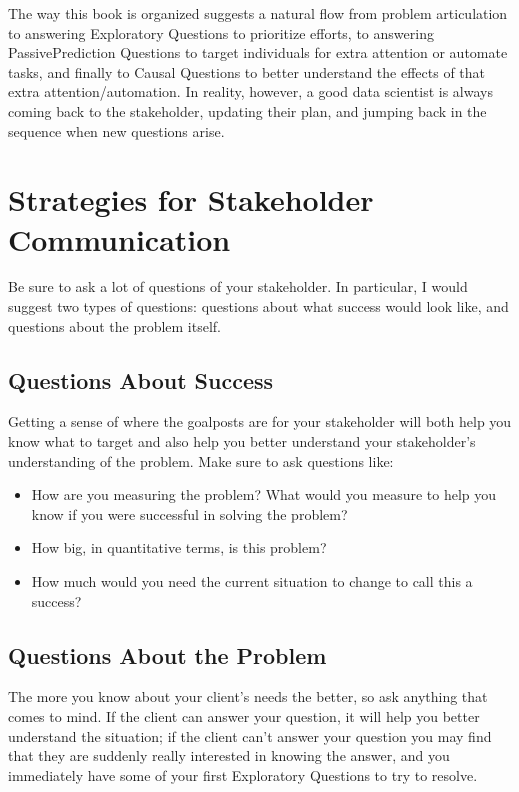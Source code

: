 \documentclass[letterpaper,10pt,english]{jupyterBook}
\begin{document}
\sphinxAtStartPar
The way this book is organized suggests a natural flow from problem articulation to answering Exploratory Questions to prioritize efforts, to answering Passive\sphinxhyphen{}Prediction Questions to target individuals for extra attention or automate tasks, and finally to Causal Questions to better understand the effects of that extra attention/automation. In reality, however, a good data scientist is always coming back to the stakeholder, updating their plan, and jumping back in the sequence when new questions arise.


\section{Strategies for Stakeholder Communication}
\label{\detokenize{20_problems_to_questions/20_stakeholder_management:strategies-for-stakeholder-communication}}
\sphinxAtStartPar
Be sure to ask a lot of questions of your stakeholder. In particular, I would suggest two types of questions: questions about what success would look like, and questions about the problem itself.


\subsection{Questions About Success}
\label{\detokenize{20_problems_to_questions/20_stakeholder_management:questions-about-success}}
\sphinxAtStartPar
Getting a sense of where the goalposts are for your stakeholder will both help you know what to target and also help you better understand your stakeholder’s understanding of the problem. Make sure to ask questions like:
\begin{itemize}
\item {} 
\sphinxAtStartPar
How are you measuring the problem? What would you measure to help you know if you were successful in solving the problem?

\item {} 
\sphinxAtStartPar
How big, in quantitative terms, is this problem?

\item {} 
\sphinxAtStartPar
How much would you need the current situation to change to call this a success?

\end{itemize}


\subsection{Questions About the Problem}
\label{\detokenize{20_problems_to_questions/20_stakeholder_management:questions-about-the-problem}}
\sphinxAtStartPar
The more you know about your client’s needs the better, so ask anything that comes to mind. If the client can answer your question, it will help you better understand the situation; if the client can’t answer your question you may find that they are suddenly really interested in knowing the answer, and you immediately have some of your first Exploratory Questions to try to resolve.
\end{document}
